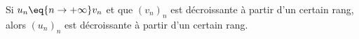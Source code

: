 Si $u_n \eq{n\to+\infty}  v_n$ et que $(v_n)_n$ est décroissante à partir d'un certain rang, alors $(u_n)_n$ est décroissante à partir d'un certain rang.

\begin{reponses}
\end{reponses}


